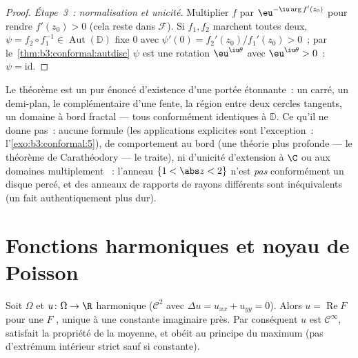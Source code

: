 \begin{proof}
\emph{Étape~3~: normalisation et unicité.} Multiplier $f$ par
$\eu^{-\iu\arg f'(z_0)}$ pour rendre $f'(z_0) > 0$ (cela reste
dans $\mathcal F$). Si $f_1, f_2$ marchent toutes deux, $\psi
= f_2\circ f_1^{-1} \in \operatorname{Aut}(\mathbb D)$ fixe
$0$ avec $\psi'(0) = f_2'(z_0)/f_1'(z_0) > 0$~; par
le~\cref{thm:b3:conformal:autdisc} $\psi$ est une rotation
$\eu^{\iu\theta}$ avec $\eu^{\iu\theta} > 0$~: $\psi =
\mathrm{id}$.
\end{proof}

\begin{remark}\label{rem:b3:conformal:rmtscope}
Le théorème est un pur énoncé d'existence d'une portée
étonnante~: un carré, un demi-plan, le complémentaire d'une
fente, la région entre deux cercles tangents, un domaine à
bord fractal --- tous conformément identiques à $\mathbb D$.
Ce qu'il ne donne pas~: aucune formule (les applications
explicites sont l'exception~: l'\cref{exo:b3:conformal:5}), de
comportement au bord (une théorie plus profonde --- le
théorème de Carathéodory --- le traite), ni d'unicité
d'extension à $\C$ ou aux domaines multiplement ~:
l'anneau $\{1 < \abs z < 2\}$ n'est \emph{pas}
conformément un disque percé, et des anneaux de rapports de
rayons différents sont inéquivalents (un fait
authentiquement plus dur).
\end{remark}

\section{Fonctions harmoniques et noyau de Poisson}

\begin{proposition}\label{prop:b3:conformal:harmonicholo}
Soit $\Omega$  et $u \colon \Omega \to \R$
harmonique ($\mathcal C^2$ avec
$\Delta u = u_{xx} + u_{yy} = 0$). Alors $u =
\operatorname{Re}F$ pour une $F$ , unique à une
constante imaginaire près. Par conséquent $u$ est $\mathcal
C^\infty$, satisfait la propriété de la moyenne, et obéit au
principe du maximum (pas d'extrémum intérieur strict sauf si
constante).
\end{proposition}


